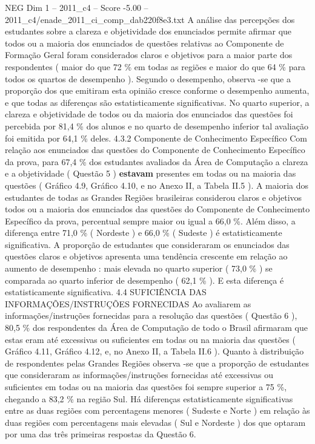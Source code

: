 \begin{textsample}{NEG Dim 1 – 2011\_c4 – Score -5.00 – 2011\_c4/enade\_2011\_ci\_comp\_dab220f8e3.txt}
A análise das percepções dos estudantes sobre a clareza e objetividade dos enunciados permite afirmar que todos ou a maioria dos enunciados de questões relativas ao Componente de Formação Geral foram considerados claros e objetivos para a maior parte dos respondentes ( maior do que 72 \% em todas as regiões e maior do que 64 \% para todos os quartos de desempenho ).
Segundo o desempenho, observa -se que a proporção dos que emitiram esta opinião cresce conforme o desempenho aumenta, e que todas as diferenças são estatisticamente significativas.
No quarto superior, a clareza e objetividade de todos ou da maioria dos enunciados das questões foi percebida por 81,4 \% dos alunos e no quarto de desempenho inferior tal avaliação foi emitida por 64,1 \% deles. 4.3.2 Componente de Conhecimento Específico Com relação aos enunciados das questões do Componente de Conhecimento Específico da prova, para 67,4 \% dos estudantes avaliados da Área de Computação a clareza e a objetividade ( Questão 5 ) \textbf{estavam} presentes em todas ou na maioria das questões ( Gráfico 4.9, Gráfico 4.10, e no Anexo II, a Tabela II.5 ).
A maioria dos estudantes de todas as Grandes Regiões brasileiras considerou claros e objetivos todos ou a maioria dos enunciados das questões do Componente de Conhecimento Específico da prova, percentual sempre maior ou igual a 66,0 \%.
Além disso, a diferença entre 71,0 \% ( Nordeste ) e 66,0 \% ( Sudeste ) é estatisticamente significativa.
A proporção de estudantes que consideraram os enunciados das questões claros e objetivos apresenta uma tendência crescente em relação ao aumento de desempenho : mais elevada no quarto superior ( 73,0 \% ) se comparada ao quarto inferior de desempenho ( 62,1 \% ).
E esta diferença é estatisticamente significativa. 4.4 SUFICIÊNCIA DAS INFORMAÇÕES/INSTRUÇÕES FORNECIDAS Ao avaliarem as informações/instruções fornecidas para a resolução das questões ( Questão 6 ), 80,5 \% dos respondentes da Área de Computação de todo o Brasil afirmaram que estas eram até excessivas ou suficientes em todas ou na maioria das questões ( Gráfico 4.11, Gráfico 4.12, e, no Anexo II, a Tabela II.6 ).
Quanto à distribuição de respondentes pelas Grandes Regiões observa -se que a proporção de estudantes que consideraram as informações/instruções fornecidas até excessivas ou suficientes em todas ou na maioria das questões foi sempre superior a 75 \%, chegando a 83,2 \% na região Sul.
Há diferenças estatisticamente significativas entre as duas regiões com percentagens menores ( Sudeste e Norte ) em relação às duas regiões com percentagens mais elevadas ( Sul e Nordeste ) dos que optaram por uma das três primeiras respostas da Questão 6.

\end{textsample}
